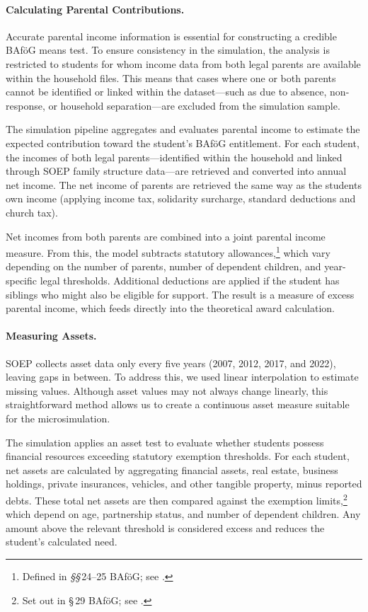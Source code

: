 \paragraph{Calculating Parental Contributions.}
Accurate parental income information is essential for constructing a credible BAföG means test. 
To ensure consistency in the simulation, the analysis is restricted to students for whom income data from both legal parents are available within the household files. 
This means that cases where one or both parents cannot be identified or linked within the dataset—such as due to absence, non-response, or household separation—are excluded from the simulation sample.

The simulation pipeline aggregates and evaluates parental income to estimate the expected contribution toward the student’s BAföG entitlement. 
For each student, the incomes of both legal parents—identified within the household and linked through SOEP family structure data—are retrieved and converted into annual net income. 
The net income of parents are retrieved the same way as the students own income (applying income tax, solidarity surcharge, standard deductions and church tax).

Net incomes from both parents are combined into a joint parental income measure. 
From this, the model subtracts statutory allowances,\footnote{Defined in \textit{§§}\,24–25 BAföG; see \citet{bafoeg_law}.} which vary depending on the number of parents, number of dependent children, and year-specific legal thresholds. 
Additional deductions are applied if the student has siblings who might also be eligible for support. 
The result is a measure of excess parental income, which feeds directly into the theoretical award calculation.


\paragraph{Measuring Assets.}
SOEP collects asset data only every five years (2007, 2012, 2017, and 2022), leaving gaps in between. 
To address this, we used linear interpolation to estimate missing values. 
Although asset values may not always change linearly, this straightforward method allows us to create a continuous asset measure suitable for the microsimulation.

The simulation applies an asset test to evaluate whether students possess financial resources exceeding statutory exemption thresholds. 
For each student, net assets are calculated by aggregating financial assets, real estate, business holdings, private insurances, vehicles, and other tangible property, minus reported debts. 
These total net assets are then compared against the exemption limits,\footnote{Set out in §\,29 BAföG; see \citet{bafoeg_law}.} which depend on age, partnership status, and number of dependent children. 
Any amount above the relevant threshold is considered excess and reduces the student's calculated need.

